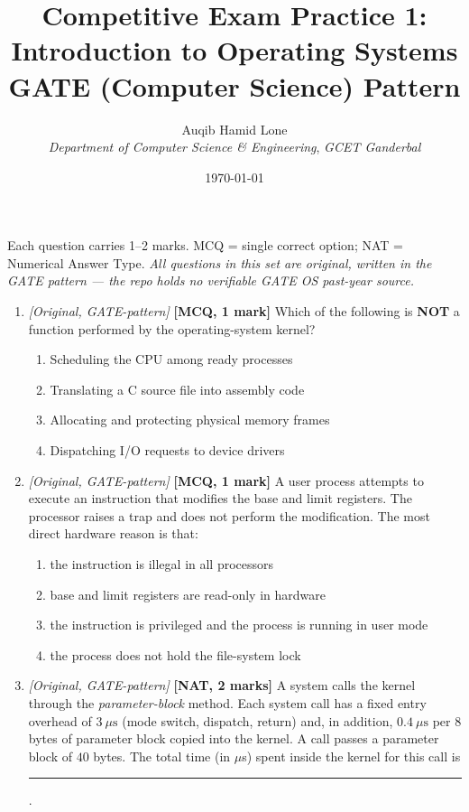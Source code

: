 \documentclass[11pt]{article}
\title{Competitive Exam Practice 1: Introduction to Operating Systems\\\large GATE (Computer Science) Pattern}
\author{Auqib Hamid Lone\\[0.3em]
  \emph{Department of Computer Science \& Engineering}, \emph{GCET Ganderbal}}
\date{\today}
\begin{document}
\maketitle

\noindent Each question carries 1--2 marks. MCQ = single correct option; NAT = Numerical Answer Type. \emph{All questions in this set are original, written in the GATE pattern --- the repo holds no verifiable GATE OS past-year source.}

\begin{enumerate}
\item[\textbf{Q1}] \textit{[Original, GATE-pattern]} \textbf{[MCQ, 1 mark]} Which of the following is \textbf{NOT} a function performed by the operating-system kernel?

\begin{enumerate}
  \item[(A)] Scheduling the CPU among ready processes
  \item[(B)] Translating a C source file into assembly code
  \item[(C)] Allocating and protecting physical memory frames
  \item[(D)] Dispatching I/O requests to device drivers
\end{enumerate}

\item[\textbf{Q2}] \textit{[Original, GATE-pattern]} \textbf{[MCQ, 1 mark]} A user process attempts to execute an instruction that modifies the base and limit registers. The processor raises a trap and does not perform the modification. The most direct hardware reason is that:

\begin{enumerate}
  \item[(A)] the instruction is illegal in all processors
  \item[(B)] base and limit registers are read-only in hardware
  \item[(C)] the instruction is privileged and the process is running in user mode
  \item[(D)] the process does not hold the file-system lock
\end{enumerate}

\item[\textbf{Q3}] \textit{[Original, GATE-pattern]} \textbf{[NAT, 2 marks]} A system calls the kernel through the \emph{parameter-block} method. Each system call has a fixed entry overhead of $3\ \mu\text{s}$ (mode switch, dispatch, return) and, in addition, $0.4\ \mu\text{s}$ per 8 bytes of parameter block copied into the kernel. A call passes a parameter block of $40$ bytes. The total time (in $\mu$s) spent inside the kernel for this call is \rule{1.5cm}{0.4pt}.


\end{enumerate}
\end{document}

